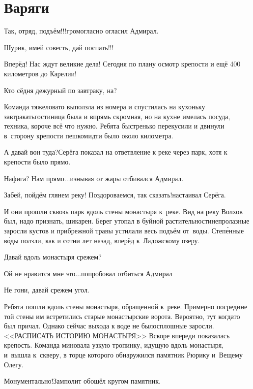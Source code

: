 \chapter{Варяги}
\vepsianrose
\fancyhead[LE]{\fancyplain{}{\bfseries \parttitle}}
\fancyhead[RO]{\fancyplain{}{\bfseries \rightmark}}

\diagdash Так, отряд, подъём!!!\mdash громогласно огласил Адмирал.

\diagdash Шурик, имей совесть, дай поспать!!!

\diagdash Вперёд! Нас ждут великие дела! Сегодня по плану осмотр крепости и ещё 400 километров до Карелии!

\diagdash Кто сёдня дежурный по завтраку, на?

Команда тяжеловато выползла из номера и спустилась на кухоньку завтракать\mdash гостиница была и впрямь скромная, но на кухне имелась посуда, техника, короче всё что нужно. Ребята быстренько перекусили и двинули в~сторону крепости пешком\mdash идти было около километра.

\diagdash А давай вон туда?\mdash Серёга показал на ответвление к реке через парк, хотя к крепости было прямо.

\diagdash Нафига? Нам прямо$\ldots$\mdash изнывая от жары отбивался Адмирал.

\diagdash Забей, пойдём глянем реку! Поздороваемся, так сказать!\mdash настаивал Серёга.

И они прошли сквозь парк вдоль стены монастыря к~реке. Вид на реку Волхов был, надо признать, шикарен. Берег утопал в буйной растительности\mdash непролазные заросли кустов и прибрежной травы устилали весь подъём от~воды. Степ\'{е}нные в\'{о}ды ползли, как и сотни лет назад, вперёд к~Ладожскому озеру.

\mdash Давай вдоль монастыря срежем?

\mdash Ой не нравится мне это$\ldots$\mdash попробовал отбиться Адмирал

\mdash Не гони, давай срежем угол.

Ребята пошли вдоль стены монастыря, обращенной к~реке. Примерно посредине той стены им встретились старые монастырские ворота. Вероятно, тут когда\sdash то был причал. Однако сейчас выхода к воде не было\mdash сплошные заросли. <<РАСПИСАТЬ ИСТОРИЮ МОНАСТЫРЯ>> Вскоре впереди показалась крепость. Команда миновала узкую тропинку, идущую вдоль монастыря, и~вышла к~скверу, в торце которого обнаружился памятник Рюрику и~Вещему Олегу. 

\diagdash Монументально!\mdash Замполит обошёл кругом памятник.

